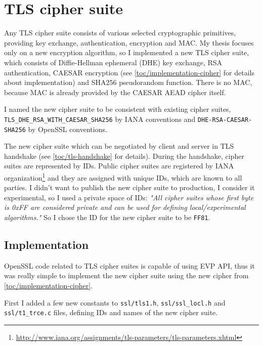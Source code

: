 \inputminted{c}{code/openssl/apps/enc.c}


\section{TLS cipher suite}
\label{toc/implementation-cipher-suite}

Any TLS cipher suite consists of various selected cryptographic primitives, providing key exchange, authentication, encryption and MAC. My thesis focuses only on a new encryption algorithm, so I implemented a new TLS cipher suite, which consists of Diffie-Hellman ephemeral (DHE) key exchange, RSA authentication, CAESAR encryption (see \autoref{toc/implementation-cipher} for details about implementation) and SHA256 pseudorandom function. There is no MAC, because MAC is already provided by the CAESAR AEAD cipher itself.

I named the new cipher suite to be consistent with existing cipher suites, \texttt{TLS\_DHE\_RSA\_WITH\_CAESAR\_SHA256} by IANA conventions and \texttt{DHE-RSA-CAESAR-SHA256} by OpenSSL conventions.

The new cipher suite which can be negotiated by client and server in TLS handshake (see \autoref{toc/tls-handshake} for details). During the handshake, cipher suites are represented by IDs. Public cipher suites are registered by IANA organization\footnote{\url{http://www.iana.org/assignments/tls-parameters/tls-parameters.xhtml}} and they are assigned with unique IDs, which are known to all parties. I didn't want to publish the new cipher suite to production, I consider it experimental, so I used a private space of IDs: \textit{"All cipher suites whose first byte is 0xFF are considered private and can be used for defining local/experimental algorithms."} \cite[p.~55]{rfc2246} So I chose the ID for the new cipher suite to be \texttt{FF81}.

\subsection{Implementation}

OpenSSL code related to TLS cipher suites is capable of using EVP API, thus it was really simple to implement the new cipher suite using the new cipher from \autoref{toc/implementation-cipher}.

First I added a few new constants to \texttt{ssl/tls1.h}, \texttt{ssl/ssl\_locl.h} and \texttt{ssl/t1\_trce.c} files, defining IDs and names of the new cipher suite.

